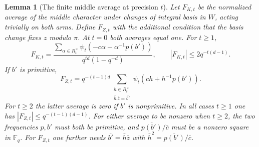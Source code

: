 \documentclass[a4paper,11pt]{article}
\newtheorem{lemma}[proposition]{Lemma}
\theoremstyle{definition}
\theoremstyle{remark}
\numberwithin{equation}{section}
\begin{document}
\begin{lemma}[The finite middle average at precision \(t\)]
\leavevmode\label{lem:middleaverage883}
Let \(F_{K,t}\) be the normalized average of the middle character
under changes of integral basis in \(W\), acting trivially on
both arms. Define \(F_{Z,t}\) with the additional condition that
the basis change fixes \(z\) modulo \(\pi\). At \(t=0\) both
averages equal one. For \(t\ge1\),
\begin{equation}
 F_{K,t}=\frac{\displaystyle\sum_{\alpha\in R_t^\times}
                 \psi_t(-c\alpha-\alpha^{-1}p(b'))}
                {q^{td}(1-q^{-d})},\qquad
 |F_{K,t}|\le 2q^{-t(d-1)}.
 \label{eq:fullmiddle883}
\end{equation}
If \(b'\) is primitive,
\begin{equation}
 F_{Z,t}=q^{-(t-1)d}
      \sum_{\substack{h\in R_t^\times\\
                      \bar h\,\bar z=\overline{b'}}}
                    \psi_t(ch+h^{-1}p(b')) .
 \label{eq:fixedmiddle883}
\end{equation}
For \(t\ge2\) the latter average is zero if \(b'\) is
nonprimitive. In all cases \(t\ge1\) one has
\(|F_{Z,t}|\le q^{-(t-1)(d-1)}\).
For either average to be nonzero when \(t\ge2\), the two
frequencies \(p,b'\) must both be primitive, and
\(\overline{p(b')}/\bar c\) must be a nonzero square in
\(\mathbb F_q\). For \(F_{Z,t}\) one further needs
\(\overline{b'}=\bar h\bar z\) with
\(\bar h^2=\overline{p(b')}/\bar c\).
\end{lemma}
\end{document}
